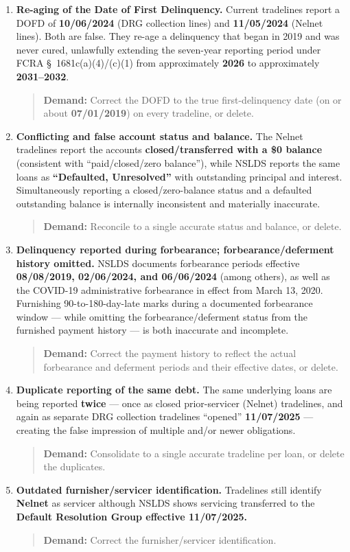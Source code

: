 \documentclass[11pt]{article}
\newcommand{\demand}[1]{\begin{quote}\textbf{Demand:} #1\end{quote}}
\begin{document}
\begin{enumerate}
  \item \textbf{Re-aging of the Date of First Delinquency.} Current tradelines report a DOFD of \textbf{10/06/2024} (DRG collection lines) and \textbf{11/05/2024} (Nelnet lines). Both are false. They re-age a delinquency that began in 2019 and was never cured, unlawfully extending the seven-year reporting period under FCRA \S~1681c(a)(4)/(c)(1) from approximately \textbf{2026} to approximately \textbf{2031--2032}.
  \demand{Correct the DOFD to the true first-delinquency date (on or about \textbf{07/01/2019}) on every tradeline, or delete.}

  \item \textbf{Conflicting and false account status and balance.} The Nelnet tradelines report the accounts \textbf{closed/transferred with a \$0 balance} (consistent with ``paid/closed/zero balance''), while NSLDS reports the same loans as \textbf{``Defaulted, Unresolved''} with outstanding principal and interest. Simultaneously reporting a closed/zero-balance status and a defaulted outstanding balance is internally inconsistent and materially inaccurate.
  \demand{Reconcile to a single accurate status and balance, or delete.}

  \item \textbf{Delinquency reported during forbearance; forbearance/deferment history omitted.} NSLDS documents forbearance periods effective \textbf{08/08/2019, 02/06/2024, and 06/06/2024} (among others), as well as the COVID-19 administrative forbearance in effect from March 13, 2020. Furnishing 90-to-180-day-late marks during a documented forbearance window --- while omitting the forbearance/deferment status from the furnished payment history --- is both inaccurate and incomplete.
  \demand{Correct the payment history to reflect the actual forbearance and deferment periods and their effective dates, or delete.}

  \item \textbf{Duplicate reporting of the same debt.} The same underlying loans are being reported \textbf{twice} --- once as closed prior-servicer (Nelnet) tradelines, and again as separate DRG collection tradelines ``opened'' \textbf{11/07/2025} --- creating the false impression of multiple and/or newer obligations.
  \demand{Consolidate to a single accurate tradeline per loan, or delete the duplicates.}

  \item \textbf{Outdated furnisher/servicer identification.} Tradelines still identify \textbf{Nelnet} as servicer although NSLDS shows servicing transferred to the \textbf{Default Resolution Group effective 11/07/2025.}
  \demand{Correct the furnisher/servicer identification.}
\end{enumerate}
\end{document}
